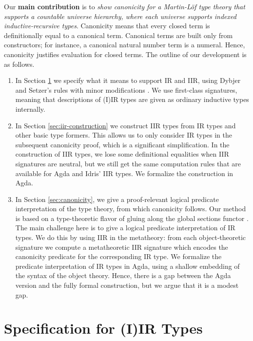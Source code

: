 \documentclass[acmsmall,screen,review,anonymous]{acmart}
\begin{document}
Our \textbf{main contribution} is to \emph{show canonicity for a Martin-Löf type theory that
supports a countable universe hierarchy, where each universe supports indexed inductive-recursive
types}. Canonicity means that every closed term is definitionally equal to a canonical
term. Canonical terms are built only from constructors; for instance, a canonical natural number
term is a numeral. Hence, canonicity justifies evaluation for closed terms. The outline of our
development is as follows.

\begin{enumerate}
\item In Section \ref{sec:specification} we specify what it means to support IR and IIR, using
  Dybjer and Setzer's rules with minor modifications \cite{DBLP:journals/apal/DybjerS03}. We use
  first-class signatures, meaning that descriptions of (I)IR types are given as ordinary inductive
  types internally.
\item In Section \ref{sec:iir-construction} we construct IIR types from IR types and other basic
  type formers. This allows us to only consider IR types in the subsequent canonicity proof, which
  is a significant simplification. In the construction of IIR types, we lose some definitional
  equalities when IIR signatures are neutral, but we still get the same computation rules that are
  available for Agda and Idris' IIR types. We formalize the construction in Agda.
\item In Section \ref{sec:canonicity}, we give a proof-relevant logical predicate interpretation of
  the type theory, from which canonicity follows. Our method is based on a type-theoretic flavor of
  gluing along the global sections functor \cite{gluing,coquand2018canonicity}. The main challenge
  here is to give a logical predicate interpretation of IR types. We do this by using IIR in the
  metatheory: from each object-theoretic signature we compute a metatheoretic IIR signature which
  encodes the canonicity predicate for the corresponding IR type.  We formalize the predicate
  interpretation of IR types in Agda, using a shallow embedding of the syntax of the object
  theory. Hence, there is a gap between the Agda version and the fully formal construction, but we
  argue that it is a modest gap. 
\end{enumerate}

\section{Specification for (I)IR Types}\label{sec:specification}
\end{document}
